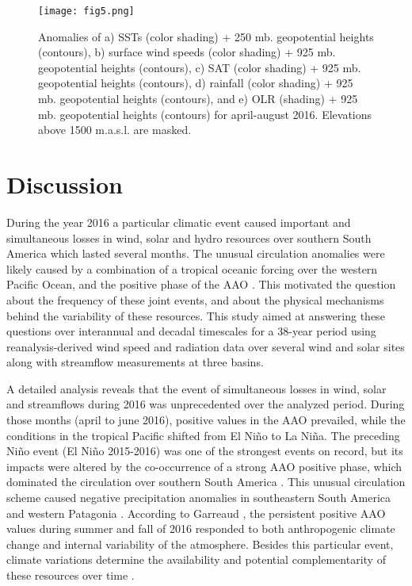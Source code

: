 \documentclass[AMA,Times1COL]{WileyNJDv5} %
\begin{document}
\begin{linenumbers}
\begin{figure*}[hbpt]
	\centering
	\hspace*{-1cm}   
	\texttt{[image: fig5.png]}
	\caption{\label{2016} 
		Anomalies of a) SSTs (color shading) + 250 mb. geopotential heights (contours), b) surface wind speeds (color shading) + 925 mb. geopotential heights (contours), c) SAT (color shading) + 925 mb. geopotential heights (contours), d) rainfall (color shading) + 925 mb. geopotential heights (contours), and e) OLR (shading) + 925 mb. geopotential heights (contours) for april-august 2016. Elevations above 1500 m.a.s.l. are masked.}
\end{figure*}

\section{Discussion}

During the year 2016 a particular climatic event caused important and simultaneous losses in wind, solar and hydro resources over southern South America which lasted several months. The unusual circulation anomalies were likely caused by a combination of a tropical oceanic forcing over the western Pacific Ocean, and the positive phase of the AAO \cite{garreaud2018record,vera2018activity}. This motivated the question about the frequency of these joint events, and about the physical mechanisms behind the variability of these resources. This study aimed at answering these questions over interannual and decadal timescales for a 38-year period using reanalysis-derived wind speed and radiation data over several wind and solar sites along with streamflow measurements at three basins. 

A detailed analysis reveals that the event of simultaneous losses in wind, solar and streamflows during 2016 was unprecedented over the analyzed period. During those months (april to june 2016), positive values in the AAO prevailed, while the conditions in the tropical Pacific shifted from El Niño to La Niña. The preceding Niño event (El Niño 2015-2016) was one of the strongest events on record, but its impacts were altered by the co-occurrence of a strong AAO positive phase, which dominated the circulation over southern South America \cite{vera2018activity}. This unusual circulation scheme caused negative precipitation anomalies in southeastern South America and western Patagonia \cite{vera2018activity, garreaud2018record}. According to Garreaud \cite{garreaud2018record}, the persistent positive AAO values during summer and fall of 2016 responded to both anthropogenic climate change and internal variability of the atmosphere. Besides this particular event, climate variations determine the availability and potential complementarity of these resources over time \cite{gonzalez2022making}.


\end{linenumbers}
\end{document}
